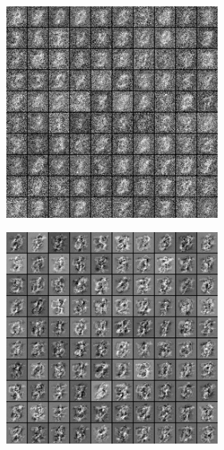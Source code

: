 \documentclass[a4paper]{scrartcl}
\begin{document}
\begin{minipage}[t]{0.5\textwidth}
\includegraphics[width=7cm]{images/filtry_10epoch_50train.png}
\end{minipage}
\begin{minipage}[t]{0.5\textwidth}
\includegraphics[width=7cm]{images/filters_epoch500_train50.png}
\end{minipage}
\end{document}
